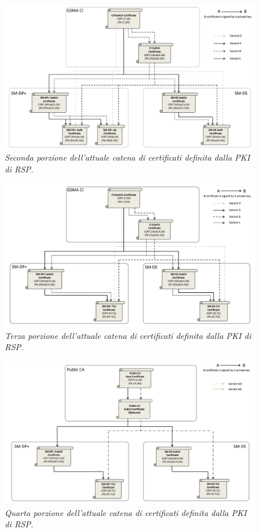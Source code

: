 \documentclass[10pt, oneside]{book}
\begin{document}
\begin{figure}
\includegraphics[width=\linewidth]{cert-chain-new2.png}
\caption{\textit{Seconda porzione dell'attuale catena di certificati definita dalla PKI di RSP.}}
\label{fig:cert-chain-new2}
\end{figure}
\begin{figure}
\includegraphics[width=\linewidth]{cert-chain-new3.png}
\caption{\textit{Terza porzione dell'attuale catena di certificati definita dalla PKI di RSP.}}
\label{fig:cert-chain-new3}
\end{figure}
\begin{figure}
\includegraphics[width=\linewidth]{cert-chain-new4.png}
\caption{\textit{Quarta porzione dell'attuale catena di certificati definita dalla PKI di RSP.}}
\label{fig:cert-chain-new4}
\end{figure}
\end{document}
